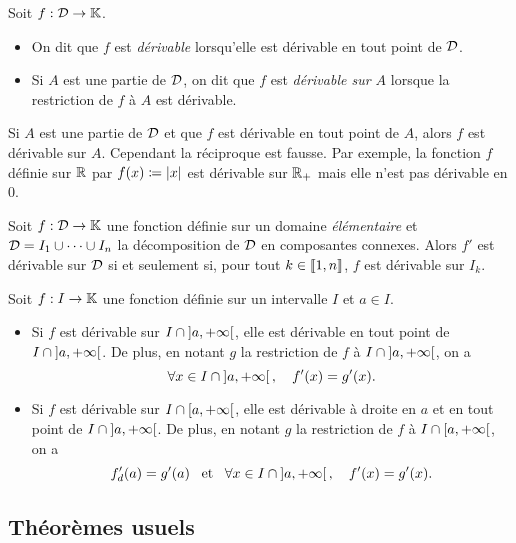 \documentclass{magnoliaold}
\begin{document}
\begin{definition}[utile=-3]
Soit $f:\mathcal{D}\to\mathbb{K}$.
\begin{itemize}
\item On dit que $f$ est \emph{dérivable} lorsqu'elle est dérivable en tout point
  de $\mathcal{D}$.
\item Si $A$ est une partie de $\mathcal{D}$, on dit que $f$ est \emph{dérivable sur $A$} lorsque
  la restriction de $f$ à $A$ est dérivable.
\end{itemize}
\end{definition}

\begin{remarqueUnique}
\remarque Si $A$ est une partie de $\mathcal{D}$ et que $f$ est dérivable en tout point de $A$,
  alors $f$ est dérivable sur $A$. Cependant la réciproque est fausse. Par exemple,
  la fonction $f$ définie sur $\mathbb{R}$ par $f(x)\coloneqq\left|x\right|$ est dérivable sur $\mathbb{R}_+$ mais elle
  n'est pas dérivable en 0.
\end{remarqueUnique}

\begin{proposition}
Soit $f:\mathcal{D}\to\mathbb{K}$ une fonction définie sur un domaine \emph{élémentaire} et
$\mathcal{D}=I_1\cup\cdots\cup I_n$ la décomposition de $\mathcal{D}$ en composantes connexes. Alors
$f'$ est dérivable sur $\mathcal{D}$ si et seulement si, pour tout $k\in\left\llbracket 1,n\right\rrbracket$, $f$
est dérivable sur $I_k$.
\end{proposition}

\begin{proposition}
Soit $f:I\to\mathbb{K}$ une fonction définie sur un intervalle $I$ et $a\in I$.
\begin{itemize}
\item Si $f$ est dérivable sur $I\cap\left]a,+\infty\right[$, elle est dérivable en tout
  point de $I\cap\left]a,+\infty\right[$. De plus, en notant $g$ la restriction de 
  $f$ à $I\cap\left]a,+\infty\right[$, on a
  \[\forall x\in I\cap\left]a,+\infty\right[,\quad f'(x)=g'(x).\]
\item Si $f$ est dérivable sur $I\cap\left[a,+\infty\right[$, elle est dérivable à droite
  en $a$ et en tout point de $I\cap\left]a,+\infty\right[$. De plus, en notant $g$ la 
  restriction de $f$ à $I\cap\left[a,+\infty\right[$, on a
  \[f_d'(a)=g'(a) \quad\!\text{et}\quad\! \forall x\in I\cap\left]a,+\infty\right[,\quad f'(x)=g'(x).\]
\end{itemize}
\end{proposition}

\subsection{Théorèmes usuels}
\end{document}
